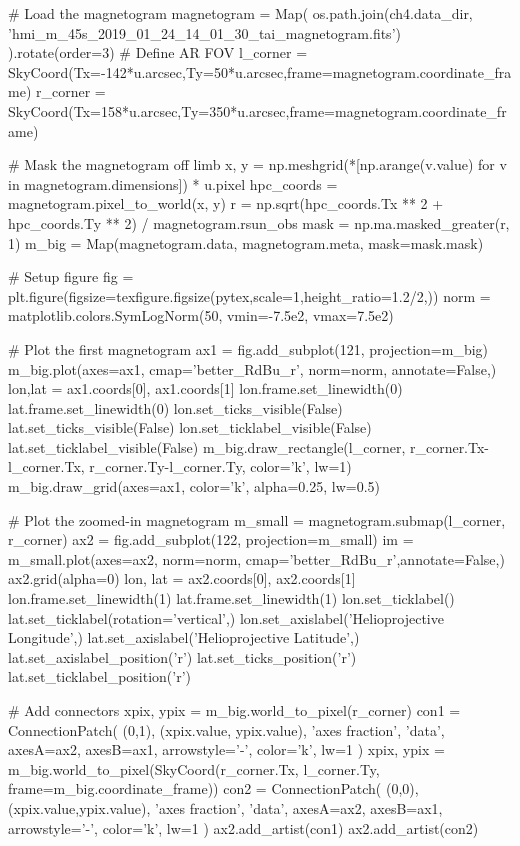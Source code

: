 \begin{pycode}[chapter4]
# Load the magnetogram
magnetogram = Map(
    os.path.join(ch4.data_dir, 'hmi_m_45s_2019_01_24_14_01_30_tai_magnetogram.fits')
).rotate(order=3)
# Define AR FOV
l_corner = SkyCoord(Tx=-142*u.arcsec,Ty=50*u.arcsec,frame=magnetogram.coordinate_frame)
r_corner = SkyCoord(Tx=158*u.arcsec,Ty=350*u.arcsec,frame=magnetogram.coordinate_frame)

# Mask the magnetogram off limb
x, y = np.meshgrid(*[np.arange(v.value) for v in magnetogram.dimensions]) * u.pixel
hpc_coords = magnetogram.pixel_to_world(x, y)
r = np.sqrt(hpc_coords.Tx ** 2 + hpc_coords.Ty ** 2) / magnetogram.rsun_obs
mask = np.ma.masked_greater(r, 1)
m_big = Map(magnetogram.data, magnetogram.meta, mask=mask.mask)

# Setup figure
fig = plt.figure(figsize=texfigure.figsize(pytex,scale=1,height_ratio=1.2/2,))
norm = matplotlib.colors.SymLogNorm(50, vmin=-7.5e2, vmax=7.5e2)

# Plot the first magnetogram
ax1 = fig.add_subplot(121, projection=m_big)
m_big.plot(axes=ax1, cmap='better_RdBu_r', norm=norm, annotate=False,)
lon,lat = ax1.coords[0], ax1.coords[1]
lon.frame.set_linewidth(0)
lat.frame.set_linewidth(0)
lon.set_ticks_visible(False)
lat.set_ticks_visible(False)
lon.set_ticklabel_visible(False)
lat.set_ticklabel_visible(False)
m_big.draw_rectangle(l_corner, r_corner.Tx-l_corner.Tx, r_corner.Ty-l_corner.Ty, color='k', lw=1)
m_big.draw_grid(axes=ax1, color='k', alpha=0.25, lw=0.5)

# Plot the zoomed-in magnetogram
m_small = magnetogram.submap(l_corner, r_corner)
ax2 = fig.add_subplot(122, projection=m_small)
im = m_small.plot(axes=ax2, norm=norm, cmap='better_RdBu_r',annotate=False,)
ax2.grid(alpha=0)
lon, lat = ax2.coords[0], ax2.coords[1]
lon.frame.set_linewidth(1)
lat.frame.set_linewidth(1)
lon.set_ticklabel()
lat.set_ticklabel(rotation='vertical',)
lon.set_axislabel('Helioprojective Longitude',)
lat.set_axislabel('Helioprojective Latitude',)
lat.set_axislabel_position('r')
lat.set_ticks_position('r')
lat.set_ticklabel_position('r')

# Add connectors
xpix, ypix = m_big.world_to_pixel(r_corner)
con1 = ConnectionPatch(
    (0,1), (xpix.value, ypix.value), 'axes fraction', 'data', axesA=ax2, axesB=ax1,
    arrowstyle='-', color='k', lw=1
)
xpix, ypix = m_big.world_to_pixel(SkyCoord(r_corner.Tx, l_corner.Ty, frame=m_big.coordinate_frame))
con2 = ConnectionPatch(
    (0,0), (xpix.value,ypix.value), 'axes fraction', 'data', axesA=ax2, axesB=ax1,
    arrowstyle='-', color='k', lw=1
)
ax2.add_artist(con1)
ax2.add_artist(con2)


\end{pycode}
